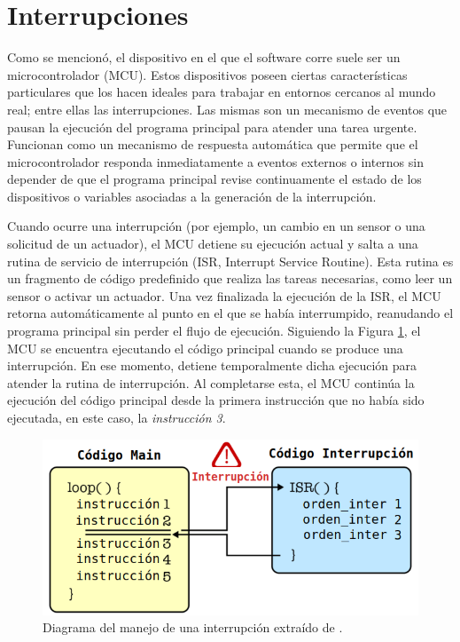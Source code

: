 \section{Interrupciones}
\label{secInterrupciones}
Como se mencionó, el dispositivo en el que el software corre suele ser un microcontrolador (\gls{MCU}). Estos dispositivos poseen ciertas características particulares que los hacen ideales para trabajar en entornos cercanos al mundo real; entre ellas las interrupciones. Las mismas son un mecanismo de eventos que pausan la ejecución del programa principal para atender una tarea urgente. Funcionan como un mecanismo de respuesta automática que permite que el microcontrolador responda inmediatamente a eventos externos o internos sin depender de que el programa principal revise continuamente el estado de los dispositivos o variables asociadas a la generación de la interrupción.

Cuando ocurre una interrupción (por ejemplo, un cambio en un sensor o una solicitud de un actuador), el \gls{MCU} detiene su ejecución actual y salta a una rutina de servicio de interrupción (ISR, Interrupt Service Routine). Esta rutina es un fragmento de código predefinido que realiza las tareas necesarias, como leer un sensor o activar un actuador. Una vez finalizada la ejecución de la ISR, el \gls{MCU} retorna automáticamente al punto en el que se había interrumpido, reanudando el programa principal sin perder el flujo de ejecución. Siguiendo la Figura \ref{interrupt}, el \gls{MCU} se encuentra ejecutando el código principal cuando se produce una interrupción. En ese momento, detiene temporalmente dicha ejecución para atender la rutina de interrupción. Al completarse esta, el \gls{MCU} continúa la ejecución del código principal desde la primera instrucción que no había sido ejecutada, en este caso, la \textit{instrucción 3}.

\begin{figure}[H]
	\centering
    \includegraphics[width=0.65\linewidth]{components_interrupt.png}
    \caption{Diagrama del manejo de una interrupción extraído de \cite{imgInterrupciones}.}
    \label{interrupt}
\end{figure}

